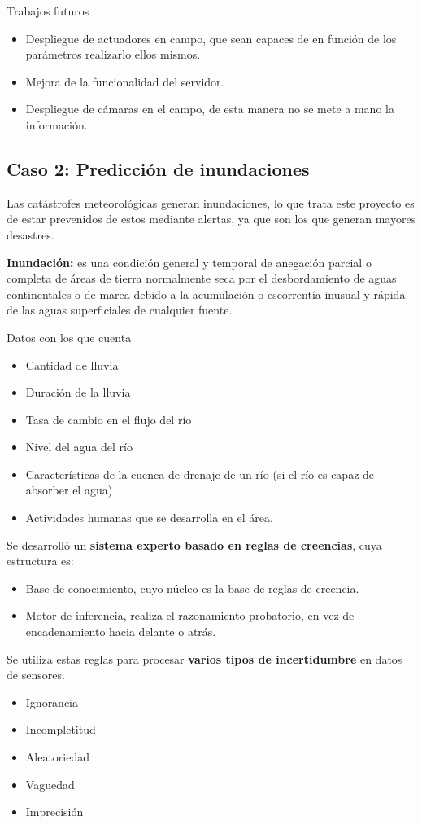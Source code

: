 \documentclass[12pt, twoside, openright]{report} %
\begin{document}
Trabajos futuros
\begin{itemize}
	\item Despliegue de actuadores en campo, que sean capaces de en función de los parámetros realizarlo ellos mismos.
	\item Mejora de la funcionalidad del servidor.
	\item Despliegue de cámaras en el campo, de esta manera no se mete a mano la información.
\end{itemize}

\subsection{Caso 2: Predicción de inundaciones}
Las catástrofes meteorológicas generan inundaciones, lo que trata este proyecto es de estar prevenidos de estos mediante alertas, ya que son los que generan mayores desastres.

\textbf{Inundación:} es una condición general y temporal de anegación parcial o completa de áreas de tierra normalmente seca por el desbordamiento de aguas continentales o de marea debido a la acumulación o escorrentía inusual y rápida de las aguas superficiales de cualquier fuente.

Datos con los que cuenta
\begin{itemize}
	\item Cantidad de lluvia
	\item Duración de la lluvia
	\item Tasa de cambio en el flujo del río
	\item Nivel del agua del río
	\item Características de la cuenca de drenaje de un río (si el río es capaz de absorber el agua)
	\item Actividades humanas que se desarrolla en el área.
\end{itemize}

Se desarrolló un \textbf{sistema experto basado en reglas de creencias}, cuya estructura es:
\begin{itemize}
	\item Base de conocimiento, cuyo núcleo es la base de reglas de creencia.
	\item Motor de inferencia, realiza el razonamiento probatorio, en vez de encadenamiento hacia delante o atrás.
\end{itemize}

Se utiliza estas reglas para procesar \textbf{varios tipos de incertidumbre} en datos de sensores.
\begin{itemize}
	\item Ignorancia
	\item Incompletitud
	\item Aleatoriedad
	\item Vaguedad
	\item Imprecisión
\end{itemize}
\end{document}

